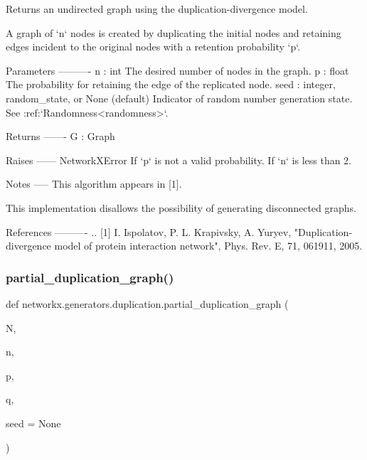 \begin{DoxyVerb}Returns an undirected graph using the duplication-divergence model.

A graph of `n` nodes is created by duplicating the initial nodes
and retaining edges incident to the original nodes with a retention
probability `p`.

Parameters
----------
n : int
    The desired number of nodes in the graph.
p : float
    The probability for retaining the edge of the replicated node.
seed : integer, random_state, or None (default)
    Indicator of random number generation state.
    See :ref:`Randomness<randomness>`.

Returns
-------
G : Graph

Raises
------
NetworkXError
    If `p` is not a valid probability.
    If `n` is less than 2.

Notes
-----
This algorithm appears in [1].

This implementation disallows the possibility of generating
disconnected graphs.

References
----------
.. [1] I. Ispolatov, P. L. Krapivsky, A. Yuryev,
   "Duplication-divergence model of protein interaction network",
   Phys. Rev. E, 71, 061911, 2005.\end{DoxyVerb}
 \mbox{\label{namespacenetworkx_1_1generators_1_1duplication_ac504b7484eda48d8646d686fda3cd439}} 
\subsubsection{\texorpdfstring{partial\+\_\+duplication\+\_\+graph()}{partial\_duplication\_graph()}}
{\footnotesize\ttfamily def networkx.\+generators.\+duplication.\+partial\+\_\+duplication\+\_\+graph (\begin{DoxyParamCaption}\item[{}]{N,  }\item[{}]{n,  }\item[{}]{p,  }\item[{}]{q,  }\item[{}]{seed = {\ttfamily None} }\end{DoxyParamCaption})}

